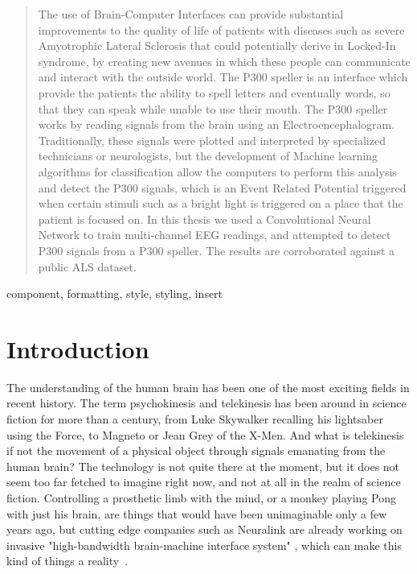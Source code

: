 \documentclass[conference]{IEEEtran}
\begin{document}
\begin{abstract}
The use of Brain-Computer Interfaces can provide substantial improvements to the quality of life of patients with diseases such as severe Amyotrophic Lateral Sclerosis that could potentially derive in Locked-In syndrome, by creating new avenues in which these people can communicate and interact with the outside world. The P300 speller is an interface which provide the patients the ability to spell letters and eventually words, so that they can speak while unable to use their mouth. The P300 speller works by reading signals from the brain using an Electroencephalogram. Traditionally, these signals were plotted and interpreted by specialized technicians or neurologists, but the development of Machine learning algorithms for classification allow the computers to perform this analysis and detect the P300 signals, which is an Event Related Potential triggered when certain stimuli such as a bright light is triggered on a place that the patient is focused on. In this thesis we used a Convolutional Neural Network to train multi-channel EEG readings, and attempted to detect P300 signals from a P300 speller. The results are corroborated against a public ALS dataset.
\end{abstract}

\begin{IEEEkeywords}
component, formatting, style, styling, insert
\end{IEEEkeywords}

\section{Introduction}
\label{intro}

The understanding of the human brain has been one of the most exciting fields in recent history. The term psychokinesis and telekinesis has been around in science fiction for more than a century, from Luke Skywalker recalling his lightsaber using the Force, to Magneto  or Jean Grey of the X-Men. And what is telekinesis if not the movement of a physical object through signals emanating from the human brain?\cite{bcianiversary:10.1080/00051144.2019.1570644} The technology is not quite there at the moment, but it does not seem too far fetched to imagine right now, and not at all in the realm of science fiction. Controlling a prosthetic limb with the mind, or a monkey playing Pong\cite{neuralinkpong} with just his brain, are things that would have been unimaginable only a few years ago, but  cutting edge companies such as Neuralink are already working on invasive "high-bandwidth brain-machine interface system" \cite{info:neuralink/10.2196/16194}, which can make this kind of things a reality~\cite{Huggins.etal2022}.  
\end{document}
